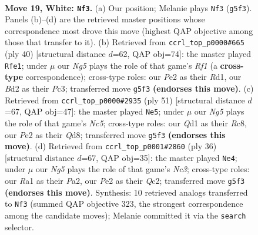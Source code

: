 \documentclass[11pt]{article}
\begin{document}
\clearpage

\begin{figure}[p]\centering
\begin{subfigure}{0.46\textwidth}\centering
\resizebox{\linewidth}{!}{%
\newchessgame
\chessboard[
  setfen={rn2k1r1/p3bp2/b5p1/3q2N1/1Pp5/6P1/P2BPP2/R2Q1RK1 w q - 0 19},
  showmover=false,
  pgfstyle=straightmove, color=movearrow, markmove={g5-f3}
]}
\caption{}
\end{subfigure}\hfill
\begin{subfigure}{0.46\textwidth}\centering
\resizebox{\linewidth}{!}{%
\newchessgame
\chessboard[
  setfen={r1b1r1k1/5pbp/2p3p1/8/2qN4/P1P1BP2/6PP/2QR1RK1 w - - 1 21},
  showmover=false,
  pgfstyle=straightmove, color=movearrow, markmove={f1-e1}
]}
\caption{}
\end{subfigure}
\\[4pt]
\begin{subfigure}{0.46\textwidth}\centering
\resizebox{\linewidth}{!}{%
\newchessgame
\chessboard[
  setfen={2rq1rk1/1p2bp2/3p2p1/3P4/p1nN1R2/6QP/PP2B1P1/R6K b - - 1 26},
  showmover=false,
  pgfstyle=straightmove, color=movearrow, markmove={c4-e5}
]}
\caption{}
\end{subfigure}\hfill
\begin{subfigure}{0.46\textwidth}\centering
\resizebox{\linewidth}{!}{%
\newchessgame
\chessboard[
  setfen={r1b2rk1/p4pp1/2p4p/3n2q1/8/2NB4/PPQ2PPP/R4RK1 w - - 0 19},
  showmover=false,
  pgfstyle=straightmove, color=movearrow, markmove={c3-e4}
]}
\caption{}
\end{subfigure}
\caption{\textbf{Move 19, White: \texttt{Nf3}.} (a) Our position; Melanie plays \texttt{Nf3} (\texttt{g5f3}). Panels (b)--(d) are the retrieved master positions whose correspondence most drove this move (highest QAP objective among those that transfer to it). (b) Retrieved from \texttt{ccrl\_top\_p0000\#665} (ply 40) [structural distance $d$=62, QAP obj=74]: the master played \texttt{Rfe1}; under $\mu$ our \emph{Ng5} plays the role of that game's \emph{Rf1} (a \textbf{cross-type} correspondence); cross-type roles: our \emph{P}e2 as their \emph{R}d1, our \emph{B}d2 as their \emph{P}c3; transferred move \texttt{g5f3} \textbf{(endorses this move)}. (c) Retrieved from \texttt{ccrl\_top\_p0000\#2935} (ply 51) [structural distance $d$=67, QAP obj=47]: the master played \texttt{Ne5}; under $\mu$ our \emph{Ng5} plays the role of that game's \emph{Nc5}; cross-type roles: our \emph{Q}d1 as their \emph{R}c8, our \emph{P}e2 as their \emph{Q}d8; transferred move \texttt{g5f3} \textbf{(endorses this move)}. (d) Retrieved from \texttt{ccrl\_top\_p0001\#2860} (ply 36) [structural distance $d$=67, QAP obj=35]: the master played \texttt{Ne4}; under $\mu$ our \emph{Ng5} plays the role of that game's \emph{Nc3}; cross-type roles: our \emph{R}a1 as their \emph{P}a2, our \emph{P}e2 as their \emph{Q}c2; transferred move \texttt{g5f3} \textbf{(endorses this move)}. Synthesis: 10 retrieved analogs transferred to \texttt{Nf3} (summed QAP objective 323, the strongest correspondence among the candidate moves); Melanie committed it via the \texttt{search} selector.}
\label{fig:thought-m36}
\end{figure}
\end{document}
